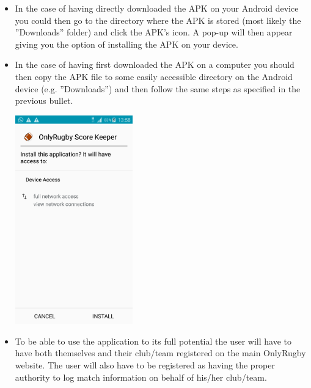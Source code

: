 \documentclass[hidelinks,a4paper,12pt]{article}
\begin{document}
\begin {itemize}
\begin{center}
	\end{center}
	\item In the case of having directly downloaded the APK on your Android device you could then go to the directory where the APK is stored (most likely the ''Downloads'' folder) and click the APK's icon. A pop-up will then appear giving you the option of installing the APK on your device.
	\item In the case of having first downloaded the APK on a computer you should then copy the APK file to some easily accessible directory on the Android device (e.g. ''Downloads'') and then follow the same steps as specified in the previous bullet.
	\begin{center}
  		 \includegraphics[width=0.4\textwidth] {./images/installation.png}\\[0.4cm]
	\end{center}
	\item To be able to use the application to its full potential the user will have to have both themselves and their club/team registered on the main OnlyRugby website. The user will also have to be registered as having the proper authority to log match information on behalf of his/her club/team. 
\end{itemize}

\newpage
\end{document}
